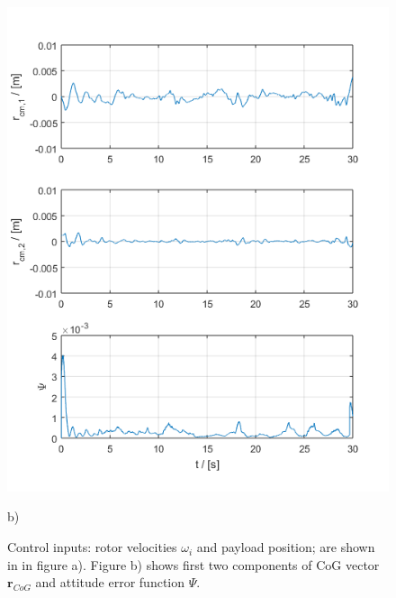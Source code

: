 \begin{figure}[h!]
\begin{minipage}{0.5\columnwidth}
		\includegraphics[width=\columnwidth]{./pictures/manip_traj_rcmPsi.png}
		\caption*{b)}
		\label{fig:manip_rcm}
	\end{minipage}
	\caption{Control inputs: rotor velocities $\omega_i$ and payload position; are shown in in figure a). Figure b) shows first two components of CoG vector $\textbf{r}_{CoG}$ and attitude error function $\Psi$.}
\end{figure}

